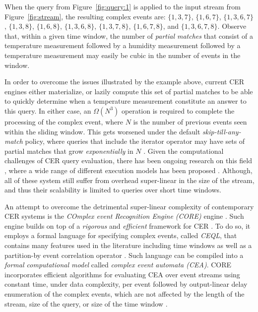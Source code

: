 \begin{example}
When the query from Figure~\ref{fig:query:1} is applied to the input stream from Figure~\ref{fig:stream}, the resulting complex events are: $\{ 1, 3, 7 \}$, $\{ 1, 6, 7 \}$, $\{ 1, 3, 6, 7 \}$, $\{ 1, 3, 8 \}$, $\{ 1, 6, 8 \}$, $\{ 1, 3, 6, 8 \}$, $\{ 1, 3, 7, 8\}$, $\{ 1, 6, 7, 8\}$, and $\{ 1, 3, 6, 7, 8\}$. Observe that, within a given time window, the number of \emph{partial matches} that consist of a temperature measurement followed by a humidity measurement followed by a temperature measurement may easily be cubic in the number of events in the window.
\end{example}

In order to overcome the issues illustrated by the example above, current CER engines either materialize, or lazily compute this set of partial matches to be able to quickly determine when a temperature measurement constitute an answer to this query. In either case, an $\Omega(N^{3})$ operation is required to complete the processing of the complex event, where $N$ is the number of previous events seen within the sliding window. This gets worsened under the default \emph{skip-till-any-match} \cite{skip-till-any-match} policy, where queries that include the iterator operator may have sets of partial matches that grow \emph{exponentially} in $N$ \cite{core}.  Given the computational challenges of CER query evaluation, there has been ongoing research on this field \cite{research-evaluation-query, formal-framework-cer}, where a wide range of different execution models has been proposed \cite{survey-systems-1, survey-systems-2}. Although, all of these system still suffer from overhead super-linear in the size of the stream, and thus their scalability is limited to queries over short time windows.

An attempt to overcome the detrimental super-linear complexity of contemporary CER systems is the \emph{COmplex event Recognition Engine (CORE)} engine \cite{core}. Such engine builds on top of a \emph{rigorous} and \emph{efficient} framework for CER \cite{formal-framework-cep, formal-framework-cer}. To do so, it employs a formal language for specifying complex events, called \emph{CEQL}, that contains many features used in the literature including time windows as well as a partition-by event correlation operator \cite{on-the-expressiveness, core}. Such language can be compiled into a \emph{formal computational model} called \emph{complex event automata (CEA)}. CORE incorporates efficient algorithms for evaluating CEA over event streams using constant time, under data complexity, per event followed by output-linear delay enumeration of the complex events, which are not affected by the length of the stream, size of the query, or size of the time window \cite{formal-framework-cer, core}.

